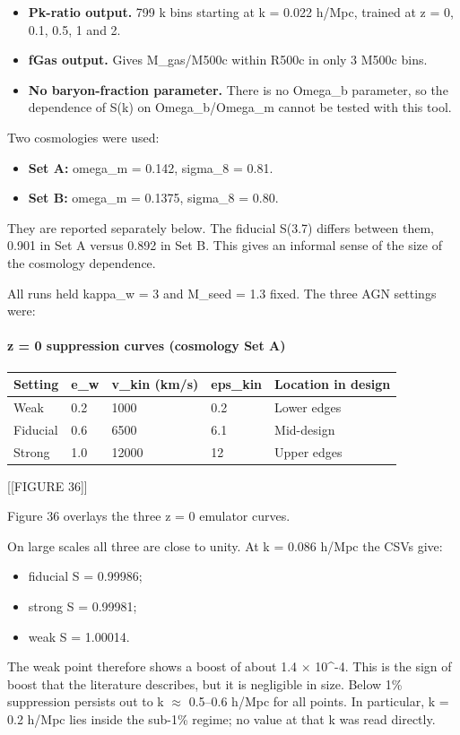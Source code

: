 \documentclass[11pt,a4paper]{article}
\begin{document}
\begin{itemize}
  \item \textbf{Pk-ratio output.} 799 k bins starting at k = 0.022 h/Mpc, trained at z = 0, 0.1, 0.5, 1 and 2.
  \item \textbf{fGas output.} Gives M\_gas/M500c within R500c in only 3 M500c bins.
  \item \textbf{No baryon-fraction parameter.} There is no Omega\_b parameter, so the dependence of S(k) on Omega\_b/Omega\_m cannot be tested with this tool.
\end{itemize}
Two cosmologies were used:

\begin{itemize}
  \item \textbf{Set A:} omega\_m = 0.142, sigma\_8 = 0.81.
  \item \textbf{Set B:} omega\_m = 0.1375, sigma\_8 = 0.80.
\end{itemize}
They are reported separately below. The fiducial S(3.7) differs between them, 0.901 in Set A versus 0.892 in Set B. This gives an informal sense of the size of the cosmology dependence.

All runs held kappa\_w = 3 and M\_seed = 1.3 fixed. The three AGN settings were:

\paragraph{z = 0 suppression curves (cosmology Set A)}
\begin{longtable}{@{}p{}p{}p{}p{}p{}@{}}
\toprule
\textbf{Setting} & \textbf{e\_w} & \textbf{v\_kin (km/s)} & \textbf{eps\_kin} & \textbf{Location in design} \\ \midrule \endhead
Weak & 0.2 & 1000 & 0.2 & Lower edges \\
Fiducial & 0.6 & 6500 & 6.1 & Mid-design \\
Strong & 1.0 & 12000 & 12 & Upper edges \\
\bottomrule\end{longtable}
[[FIGURE 36]]

Figure 36 overlays the three z = 0 emulator curves.

On large scales all three are close to unity. At k = 0.086 h/Mpc the CSVs give:

\begin{itemize}
  \item fiducial S = 0.99986;
  \item strong S = 0.99981;
  \item weak S = 1.00014.
\end{itemize}
The weak point therefore shows a boost of about 1.4 $\times$ 10\textasciicircum{}-4. This is the sign of boost that the literature describes, but it is negligible in size. Below 1\% suppression persists out to k $\approx$ 0.5--0.6 h/Mpc for all points. In particular, k = 0.2 h/Mpc lies inside the sub-1\% regime; no value at that k was read directly.
\end{document}
